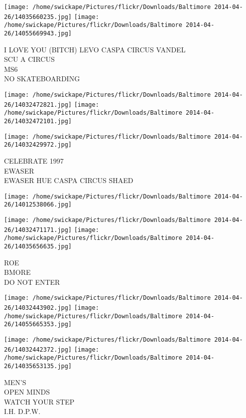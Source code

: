 \documentclass[10pt,letterpaper]{article}
\begin{document}
\texttt{[image: /home/swickape/Pictures/flickr/Downloads/Baltimore 2014-04-26/14035660235.jpg]}
\texttt{[image: /home/swickape/Pictures/flickr/Downloads/Baltimore 2014-04-26/14055669943.jpg]}

I LOVE YOU (BITCH) LEVO CASPA CIRCUS VANDEL\\
SCU A CIRCUS\\
MS6\\
NO SKATEBOARDING\\
\pagebreak

\texttt{[image: /home/swickape/Pictures/flickr/Downloads/Baltimore 2014-04-26/14032472821.jpg]}
\texttt{[image: /home/swickape/Pictures/flickr/Downloads/Baltimore 2014-04-26/14032472101.jpg]}

\vspace{0.25in}
\texttt{[image: /home/swickape/Pictures/flickr/Downloads/Baltimore 2014-04-26/14032429972.jpg]}

CELEBRATE 1997\\
EWASER\\
EWASER HUE CASPA CIRCUS SHAED\\
\pagebreak

\texttt{[image: /home/swickape/Pictures/flickr/Downloads/Baltimore 2014-04-26/14012538066.jpg]}

\vspace{0.25in}
\texttt{[image: /home/swickape/Pictures/flickr/Downloads/Baltimore 2014-04-26/14032471171.jpg]}
\texttt{[image: /home/swickape/Pictures/flickr/Downloads/Baltimore 2014-04-26/14035656635.jpg]}

ROE\\
BMORE\\
DO NOT ENTER\\
\pagebreak

\texttt{[image: /home/swickape/Pictures/flickr/Downloads/Baltimore 2014-04-26/14032443902.jpg]}
\texttt{[image: /home/swickape/Pictures/flickr/Downloads/Baltimore 2014-04-26/14055665353.jpg]}

\texttt{[image: /home/swickape/Pictures/flickr/Downloads/Baltimore 2014-04-26/14032442372.jpg]}
\texttt{[image: /home/swickape/Pictures/flickr/Downloads/Baltimore 2014-04-26/14035653135.jpg]}

MEN'S\\
OPEN MINDS\\
WATCH YOUR STEP\\
I.H. D.P.W.\\
\pagebreak
\end{document}
